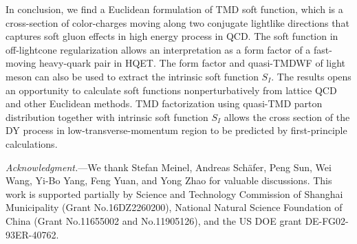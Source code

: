 \documentclass[twocolumn,aps,preprintnumbers,prd,superscriptaddress,10pt]{revtex4-1}
\begin{document}
In conclusion, we find a Euclidean formulation of TMD soft function, which is a cross-section of color-charges moving along two conjugate lightlike directions that captures soft gluon effects in high energy process in QCD.
%
The soft function in off-lightcone regularization allows an interpretation as a form factor of a fast-moving heavy-quark pair in HQET.
%
The form factor and quasi-TMDWF of light meson can also be used to extract the intrinsic soft function $S_I$.
%
The results opens an opportunity to calculate soft functions nonperturbatively from lattice QCD and other Euclidean methods.
%
TMD factorization using quasi-TMD parton distribution together with intrinsic soft function $S_I$ allows the cross section of the DY process in low-transverse-momentum region to be predicted by first-principle calculations.

{\it Acknowledgment.}---We thank Stefan Meinel, Andreas Sch\"afer, Peng Sun, Wei Wang, Yi-Bo Yang, Feng Yuan, and Yong Zhao for valuable discussions.
%
This work is supported partially by Science and Technology Commission of Shanghai Municipality (Grant No.16DZ2260200), National Natural Science Foundation of China (Grant No.11655002 and No.11905126), and the US DOE grant DE-FG02-93ER-40762.




\end{document}
